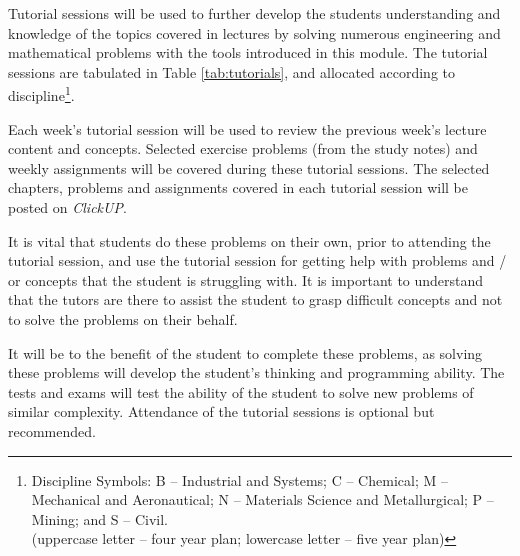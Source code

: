         Tutorial sessions will be used to further develop the students
        understanding and knowledge of the topics covered in lectures
        by solving numerous engineering and mathematical problems with
        the tools introduced in this module. The tutorial sessions are
        tabulated in Table \ref{tab:tutorials}, and allocated
        according to discipline\footnote{Discipline Symbols:
            B -- Industrial and Systems;
            C -- Chemical;
            M -- Mechanical and Aeronautical;
            N -- Materials Science and Metallurgical;
            P -- Mining; and
            S -- Civil. \\
            (uppercase letter -- four year plan;
            lowercase letter -- five year plan)}.

        Each week's tutorial session will be used to review the previous week's
        lecture content and concepts. Selected exercise problems (from the
        study notes) and weekly assignments will be covered during these
        tutorial sessions. The selected chapters, problems and assignments
        covered in each tutorial session will be posted on {\it ClickUP}.

        It is vital that students do these problems on their own, prior to
        attending the tutorial session, and use the tutorial session for
        getting help with problems and / or concepts that the student is
        struggling with. It is important to understand that the tutors are
        there to assist the student to grasp difficult concepts and not to
        solve the problems on their behalf.

        It will be to the benefit of the student to complete these problems, as
        solving these problems will develop the student's thinking and
        programming ability. The tests and exams will test the ability of the
        student to solve new problems of similar complexity. Attendance of the
        tutorial sessions is optional but recommended.

